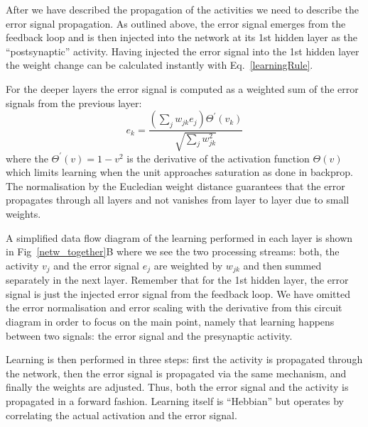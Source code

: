 \documentclass{llncs}
\begin{document}
After we have described the propagation of the activities we need to
describe the error signal propagation. As outlined above, the error
signal emerges from the feedback loop and is then injected into the
network at its 1st hidden layer as the ``postsynaptic'' activity.
Having injected the error signal into the 1st hidden layer the
weight change can be calculated instantly with Eq.~\ref{learningRule}.

For the deeper layers the error signal is computed as a weighted
sum of the error signals from the previous layer:
\begin{equation}
  e_k = \frac{\left( \sum_j w_{jk} e_{j} \right) \Theta^\prime (v_k) }{\sqrt{\sum_j w_{jk}^2}}
\end{equation}
where the $\Theta^\prime (v) = 1 - v^2$ is the derivative of the activation
function $\Theta(v)$ which limits learning when the unit approaches saturation
as done in backprop. The normalisation by the Eucledian weight
distance guarantees that the error propagates through all layers and
not vanishes from layer to layer due to small weights.

A simplified data flow diagram of the learning performed in each layer
is shown in Fig~\ref{netw_together}B where we see the two processing
streams: both, the activity $v_j$ and the error signal $e_j$ are
weighted by $w_{jk}$ and then summed separately in the next layer.
Remember that for the 1st hidden layer, the error signal is just the
injected error signal from the feedback loop. We have omitted the
error normalisation and error scaling with the derivative from this
circuit diagram in order to focus on the main point, namely that
learning happens between two signals: the error signal and the
presynaptic activity.

Learning is then performed in three steps: first the activity is
propagated through the network, then the error signal is propagated
via the same mechanism, and finally the weights are adjusted. Thus,
both the error signal and the activity is propagated in a forward
fashion.  Learning itself is ``Hebbian'' but operates by correlating
the actual activation and the error signal.
\end{document}
